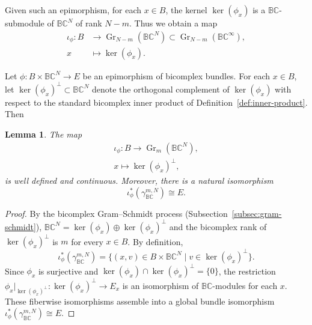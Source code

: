 \documentclass[11pt]{amsart}
\newcommand{\BC}{\mathbb{BC}}       %
\newcommand{\Gr}{\operatorname{Gr}}
\newtheorem{lem}[prop]{Lemma}
\theoremstyle{definition}
\begin{document}
Given such an epimorphism, for each $x \in B$, the kernel $\ker(\phi_x)$ is a $\BC$-submodule of $\BC^N$ of rank $N-m$. Thus we obtain a map
\begin{align*}
    \iota_\phi: B &\to \Gr_{N-m}(\BC^N) \subset \Gr_{N-m}(\BC^\infty),
    \\ x &\mapsto \ker(\phi_x).
\end{align*}



Let $\phi:B\times\mathbb{B}\mathbb{C}^{N}\to E$ be an epimorphism of bicomplex bundles.
For each $x\in B$, let $\ker(\phi_{x})^{\perp}\subset\mathbb{B}\mathbb{C}^{N}$ denote the
orthogonal complement of\/ $\ker(\phi_{x})$ with respect to the standard bicomplex
inner product of Definition~\ref{def:inner-product}.
Then
\begin{lem}\label{lem:classifying_map}
The map
\begin{gather*}
\iota_{\phi}:B\to\Gr_{m}(\BC^{N}),\\
x\mapsto\ker(\phi_{x})^{\perp},    
\end{gather*}
is well defined and continuous.  Moreover, there is a natural isomorphism
\[
\iota_{\phi}^{*}(\gamma_{\mathbb{B}\mathbb{C}}^{m,N})\cong E.
\]
\end{lem}

\begin{proof}
By the bicomplex Gram--Schmidt process (Subsection~\ref{subsec:gram-schmidt}),
$\BC^{N}=\ker(\phi_{x})\oplus\ker(\phi_{x})^{\perp}$ and the bicomplex rank of $\ker(\phi_{x})^{\perp}$ is $m$ for every $x\in B$. 
By definition,
\begin{equation*}
\iota_{\phi}^{*}(\gamma_{\mathbb{B}\mathbb{C}}^{m,N})
=\bigl\{(x,v)\in B\times\mathbb{B}\mathbb{C}^{N}\mid v\in\ker(\phi_{x})^{\perp}\bigr\}.
\end{equation*}
Since $\phi_{x}$ is surjective and $\ker(\phi_{x})\cap\ker(\phi_{x})^{\perp}=\{0\}$,
the restriction $\phi_{x}|_{\ker(\phi_{x})^{\perp}}:\ker(\phi_{x})^{\perp}\to E_{x}$
is an isomorphism of $\mathbb{B}\mathbb{C}$-modules for each $x$.  These fiberwise
isomorphisms assemble into a global bundle isomorphism
$\iota_{\phi}^{*}(\gamma_{\mathbb{B}\mathbb{C}}^{m,N})\cong E$.
\end{proof}
\end{document}
